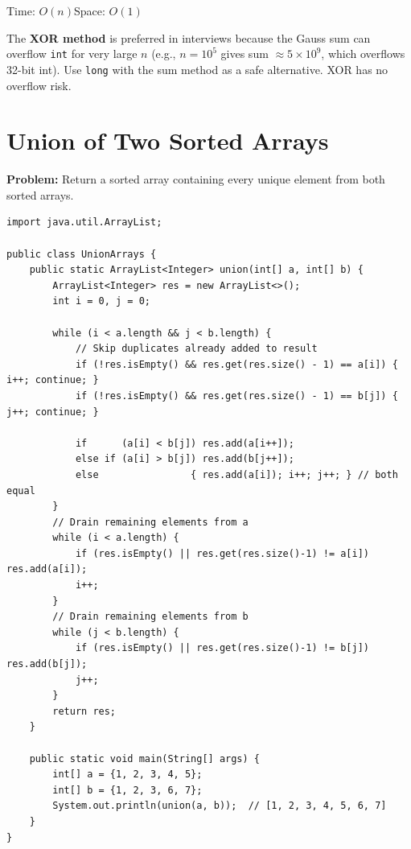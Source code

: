 \documentclass[12pt,a4paper,oneside]{book}
\begin{document}
\begin{complexity}
Time: $O(n)$\quad Space: $O(1)$
\end{complexity}

\begin{interviewcorner}
The \textbf{XOR method} is preferred in interviews because the Gauss sum can overflow \texttt{int} for very large $n$ (e.g., $n = 10^5$ gives sum $\approx 5 \times 10^{9}$, which overflows 32-bit int). Use \texttt{long} with the sum method as a safe alternative. XOR has no overflow risk.
\end{interviewcorner}

\section{Union of Two Sorted Arrays}

\textbf{Problem:} Return a sorted array containing every unique element from both sorted arrays.

\begin{lstlisting}[caption={Union of Two Sorted Arrays --- Two Pointer, O(m+n)}]
import java.util.ArrayList;

public class UnionArrays {
    public static ArrayList<Integer> union(int[] a, int[] b) {
        ArrayList<Integer> res = new ArrayList<>();
        int i = 0, j = 0;

        while (i < a.length && j < b.length) {
            // Skip duplicates already added to result
            if (!res.isEmpty() && res.get(res.size() - 1) == a[i]) { i++; continue; }
            if (!res.isEmpty() && res.get(res.size() - 1) == b[j]) { j++; continue; }

            if      (a[i] < b[j]) res.add(a[i++]);
            else if (a[i] > b[j]) res.add(b[j++]);
            else                { res.add(a[i]); i++; j++; } // both equal
        }
        // Drain remaining elements from a
        while (i < a.length) {
            if (res.isEmpty() || res.get(res.size()-1) != a[i]) res.add(a[i]);
            i++;
        }
        // Drain remaining elements from b
        while (j < b.length) {
            if (res.isEmpty() || res.get(res.size()-1) != b[j]) res.add(b[j]);
            j++;
        }
        return res;
    }

    public static void main(String[] args) {
        int[] a = {1, 2, 3, 4, 5};
        int[] b = {1, 2, 3, 6, 7};
        System.out.println(union(a, b));  // [1, 2, 3, 4, 5, 6, 7]
    }
}
\end{lstlisting}
\end{document}
